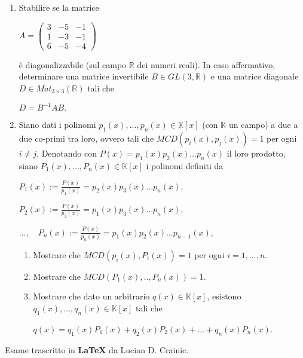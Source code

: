 \documentclass[fleqn]{article}
\begin{document}
\begin{enumerate}
   \item Stabilire se la matrice 
   \begin{center}
    $
    A = \begin{pmatrix}
       3 & -5 & -1 \\
       1 & -3 & -1 \\
       6 & -5 & -4
    \end{pmatrix}
    $
    \end{center}
   è diagonalizzabile (sul campo $\mathbb{R}$ dei numeri reali). In caso affermativo, determinare una matrice invertibile
   $B \in GL(3,\mathbb{R})$ e una matrice diagonale $D \in Mat_{3 \times 3}(\mathbb{R})$ tali che  
   \begin{center}
      $D= B^{-1}AB.$
   \end{center}
   
   \item Siano dati i polinomi $p_1(x),...,p_n(x) \in \mathbb{K}[x]$ (con $\mathbb{K}$ un campo) a due a due co-primi
   tra loro, ovvero tali che $MCD(p_i(x),p_j(x))=1$ per ogni $i \neq j$. Denotando con $P(x)=p_1(x)p_2(x)...p_n(x)$ 
   il loro prodotto, siano $P_1(x),...,P_n(x) \in \mathbb{K}[x]$ i polinomi definiti da

   $
   P_1(x) := \frac{P(x)}{p_1(x)}=p_2(x)p_3(x)...p_n(x),
   $ 
   
      \qquad \qquad \qquad \qquad $P_2(x) := \frac{P(x)}{p_2(x)}=p_1(x)p_3(x)...p_n(x),$ 

      \qquad \qquad \qquad \qquad \qquad \qquad \qquad $..., \quad P_n(x) := \frac{P(x)}{p_n(x)}=p_1(x)p_2(x)...p_{n-1}(x),$ 

   \begin{enumerate}
      \item Mostrare che $MCD(p_i(x),P_i(x))=1$ per ogni $i=1,...,n$.
      \item Mostrare che $MCD(P_1(x),..,P_n(x))=1$.
      \item Mostrare che dato un arbitrario $q(x) \in \mathbb{K}[x]$, esistono $q_1(x),...,q_n(x) \in \mathbb{K}[x]$ tali che
      \begin{center}
         $q(x)=q_1(x)P_1(x)+q_2(x)P_2(x)+...+q_n(x)P_n(x)$.
      \end{center}
   \end{enumerate}
\end{enumerate}
Esame trascritto in \textbf{\LaTeX} da Lucian D. Crainic.
\end{document}
